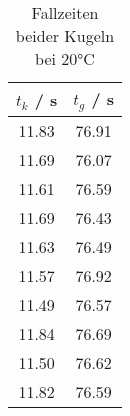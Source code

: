 \begin{table}[!htp]
\centering
\caption{Fallzeiten beider Kugeln bei 20°C}
\label{tab:fallzeit}
\begin{tabular}{c c}
\toprule
{{$t_k$ / s}} & {{$t_g$ / s}} \\
\midrule
11.83 & 76.91 \\
11.69 & 76.07 \\
11.61 & 76.59 \\
11.69 & 76.43 \\
11.63 & 76.49 \\
11.57 & 76.92 \\
11.49 & 76.57 \\
11.84 & 76.69 \\
11.50 & 76.62 \\
11.82 & 76.59 \\
\bottomrule
\end{tabular}
\end{table}
